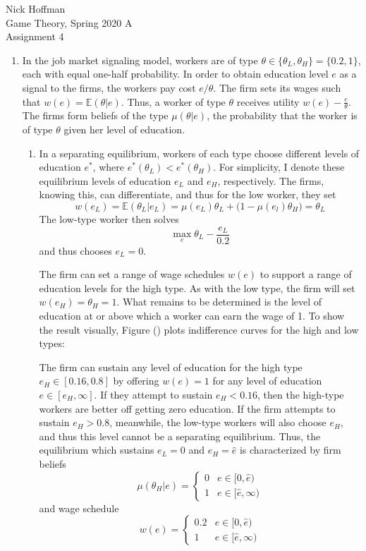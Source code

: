 \documentclass[11pt]{article}
\newcommand{\ev}{\mathbb{E}}
\begin{document}
\begin{flushleft}
	Nick Hoffman \\
	Game Theory, Spring 2020 A \\
	Assignment 4 \\
\end{flushleft}

\begin{enumerate}
	\item In the job market signaling model, workers are of type $ \theta\in\{\theta_L, \theta_H\} = \{0.2, 1\} $, each with equal one-half probability. In order to obtain education level $ e $ as a signal to the firms, the workers pay cost $ e/\theta $. The firm sets its wages such that $ w(e) = \ev(\theta|e) $. Thus, a worker of type $\theta$ receives utility $ w(e) - \frac{e}{\theta} $. The firms form beliefs of the type $ \mu(\theta|e) $, the probability that the worker is of type $\theta$ given her level of education. 
	\begin{enumerate}
		\item In a separating equilibrium, workers of each type choose different levels of education $ e^* $, where $ e^*(\theta_L) < e^*(\theta_H) $. For simplicity, I denote these equilibrium levels of education $ e_L $ and $ e_H $, respectively. The firms, knowing this, can differentiate, and thus for the low worker, they set
		\[w(e_L) = \ev(\theta_L|e_L) = \mu(e_L)\theta_L + \big(1 - \mu(e_l)\theta_H\big) = \theta_L\]
		The low-type worker then solves
		\[\max_e \theta_L - \frac{e_L}{0.2}\] 
		and thus chooses $ e_L = 0 $. 
		
		The firm can set a range of wage schedules $ w(e) $ to support a range of education levels for the high type. As with the low type, the firm will set $ w(e_H) = \theta_H = 1 $. What remains to be determined is the level of education at or above which a worker can earn the wage of 1. To show the result visually, Figure () plots indifference curves for the high and low types:
		
		The firm can sustain any level of education for the high type $ e_H\in[0.16, 0.8] $ by offering $ w(e) = 1 $ for any level of education $ e\in[e_H, \infty] $. If they attempt to sustain $ e_H < 0.16 $, then the high-type workers are better off getting zero education. If the firm attempts to sustain $ e_H > 0.8 $, meanwhile, the low-type workers will also choose $ e_H $, and thus this level cannot be a separating equilibrium. Thus, the  equilibrium which sustains $ e_L = 0 $ and $ e_H = \hat{e} $ is characterized by firm beliefs
		\[\mu(\theta_H|e) = \begin{cases}
		0 & e\in[0, \hat{e}) \\ 
		1 & e\in[\hat{e}, \infty)
		\end{cases}\]
		and wage schedule 
		\[w(e) = \begin{cases}
		0.2 & e\in[0, \hat{e}) \\ 
		1 & e\in[\hat{e}, \infty)
		\end{cases}\]
		

\end{enumerate}
\end{enumerate}
\end{document}
